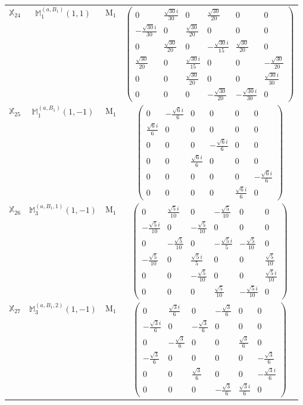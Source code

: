 \documentclass[fleqn,10pt,landscape]{article}
\begin{document}
\begin{itemize}
\begin{center}
\begin{longtable}{c|c|c|c}
$ \mathbb{X}_{24} $ & $\mathbb{M}_{1}^{(a,B_{1})}(1,1)$ & M$_{1}$ & $\begin{pmatrix} 0 & \frac{\sqrt{30} i}{30} & 0 & \frac{\sqrt{30}}{20} & 0 & 0 \\ - \frac{\sqrt{30} i}{30} & 0 & \frac{\sqrt{30}}{20} & 0 & 0 & 0 \\ 0 & \frac{\sqrt{30}}{20} & 0 & - \frac{\sqrt{30} i}{15} & \frac{\sqrt{30}}{20} & 0 \\ \frac{\sqrt{30}}{20} & 0 & \frac{\sqrt{30} i}{15} & 0 & 0 & - \frac{\sqrt{30}}{20} \\ 0 & 0 & \frac{\sqrt{30}}{20} & 0 & 0 & \frac{\sqrt{30} i}{30} \\ 0 & 0 & 0 & - \frac{\sqrt{30}}{20} & - \frac{\sqrt{30} i}{30} & 0 \end{pmatrix}$ \\
$ \mathbb{X}_{25} $ & $\mathbb{M}_{1}^{(a,B_{1})}(1,-1)$ & M$_{1}$ & $\begin{pmatrix} 0 & - \frac{\sqrt{6} i}{6} & 0 & 0 & 0 & 0 \\ \frac{\sqrt{6} i}{6} & 0 & 0 & 0 & 0 & 0 \\ 0 & 0 & 0 & - \frac{\sqrt{6} i}{6} & 0 & 0 \\ 0 & 0 & \frac{\sqrt{6} i}{6} & 0 & 0 & 0 \\ 0 & 0 & 0 & 0 & 0 & - \frac{\sqrt{6} i}{6} \\ 0 & 0 & 0 & 0 & \frac{\sqrt{6} i}{6} & 0 \end{pmatrix}$ \\
$ \mathbb{X}_{26} $ & $\mathbb{M}_{3}^{(a,B_{1},1)}(1,-1)$ & M$_{1}$ & $\begin{pmatrix} 0 & \frac{\sqrt{5} i}{10} & 0 & - \frac{\sqrt{5}}{10} & 0 & 0 \\ - \frac{\sqrt{5} i}{10} & 0 & - \frac{\sqrt{5}}{10} & 0 & 0 & 0 \\ 0 & - \frac{\sqrt{5}}{10} & 0 & - \frac{\sqrt{5} i}{5} & - \frac{\sqrt{5}}{10} & 0 \\ - \frac{\sqrt{5}}{10} & 0 & \frac{\sqrt{5} i}{5} & 0 & 0 & \frac{\sqrt{5}}{10} \\ 0 & 0 & - \frac{\sqrt{5}}{10} & 0 & 0 & \frac{\sqrt{5} i}{10} \\ 0 & 0 & 0 & \frac{\sqrt{5}}{10} & - \frac{\sqrt{5} i}{10} & 0 \end{pmatrix}$ \\
$ \mathbb{X}_{27} $ & $\mathbb{M}_{3}^{(a,B_{1},2)}(1,-1)$ & M$_{1}$ & $\begin{pmatrix} 0 & \frac{\sqrt{3} i}{6} & 0 & - \frac{\sqrt{3}}{6} & 0 & 0 \\ - \frac{\sqrt{3} i}{6} & 0 & - \frac{\sqrt{3}}{6} & 0 & 0 & 0 \\ 0 & - \frac{\sqrt{3}}{6} & 0 & 0 & \frac{\sqrt{3}}{6} & 0 \\ - \frac{\sqrt{3}}{6} & 0 & 0 & 0 & 0 & - \frac{\sqrt{3}}{6} \\ 0 & 0 & \frac{\sqrt{3}}{6} & 0 & 0 & - \frac{\sqrt{3} i}{6} \\ 0 & 0 & 0 & - \frac{\sqrt{3}}{6} & \frac{\sqrt{3} i}{6} & 0 \end{pmatrix}$ \\

\end{longtable}
\end{center}
\end{itemize}
\end{document}
